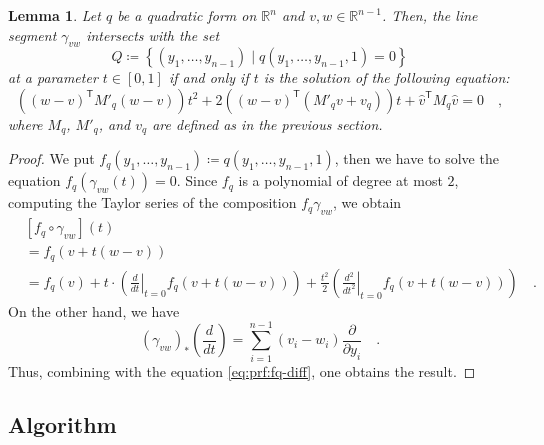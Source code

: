 \documentclass[pdftex,a4paper,12pt]{scrartcl}
\theoremstyle{plain}
\newtheorem{lemma}[theorem]{Lemma}
\theoremstyle{definition}
\theoremstyle{remark}
\begin{document}
\begin{lemma}
Let $q$ be a quadratic form on $\mathbb R^n$ and $v,w\in\mathbb R^{n-1}$.
Then, the line segment $\gamma_{vw}$ intersects with the set
\[
Q\coloneqq \left\{(y_1,\dots,y_{n-1})\mid q(y_1,\dots,y_{n-1},1)=0\right\}
\]
at a parameter $t\in[0,1]$ if and only if $t$ is the solution of the following equation:
\[
\left((w-v)^{\mathsf T}M'_q(w-v)\right)t^2
+ 2\left((w-v)^{\mathsf T}(M'_q v + v_q)\right)t
+ \widehat v^{\mathsf T}M_q \widehat v
= 0
\quad,
\]
where $M_q$, $M'_q$, and $v_q$ are defined as in the previous section.
\end{lemma}
\begin{proof}
We put $f_q(y_1,\dots,y_{n-1})\coloneqq q(y_1,\dots,y_{n-1},1)$, then we have to solve the equation $f_q(\gamma_{vw}(t))=0$.
Since $f_q$ is a polynomial of degree at most $2$, computing the Taylor series of the composition $f_q\gamma_{vw}$, we obtain
\[
\begin{split}
&[f_q\circ\gamma_{vw}](t) \\
&= f_q(v+t(w-v)) \\
&= f_q(v)
+ t\cdot\left(\left.\frac{d}{dt}\right|_{t=0} f_q(v+t(w-v))\right)
+ \frac{t^2}{2}\left(\left.\frac{d^2}{dt^2}\right|_{t=0} f_q(v+t(w-v))\right)
\quad.
\end{split}
\]
On the other hand, we have
\[
(\gamma_{vw})_\ast\left(\frac{d}{dt}\right)
= \sum_{i=1}^{n-1} (v_i-w_i)\frac\partial{\partial y_i}
\quad.
\]
Thus, combining with the equation \eqref{eq:prf:fq-diff}, one obtains the result.
\end{proof}

\subsection{Algorithm}
\end{document}
